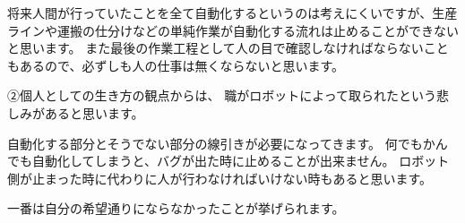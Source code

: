 \documentclass[11pt,a4paper]{jsarticle}
\begin{document}
将来人間が行っていたことを全て自動化するというのは考えにくいですが、生産ラインや運搬の仕分けなどの単純作業が自動化する流れは止めることができないと思います。
また最後の作業工程として人の目で確認しなければならないこともあるので、必ずしも人の仕事は無くならないと思います。

②個人としての生き方の観点からは、
職がロボットによって取られたという悲しみがあると思います。

自動化する部分とそうでない部分の線引きが必要になってきます。
何でもかんでも自動化してしまうと、バグが出た時に止めることが出来ません。
ロボット側が止まった時に代わりに人が行わなければいけない時もあると思います。

一番は自分の希望通りにならなかったことが挙げられます。
\end{document}
